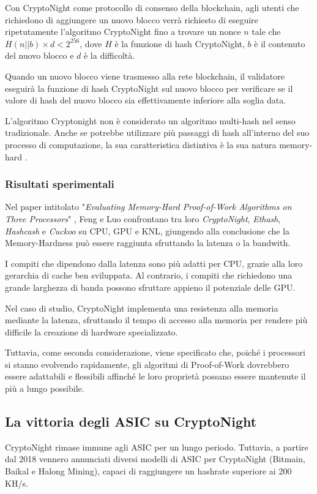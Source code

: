 Con CryptoNight come protocollo di consenso della blockchain, agli utenti che richiedono di aggiungere un nuovo blocco verrà richiesto di eseguire ripetutamente l'algoritmo CryptoNight fino a trovare un nonce $n$ tale che $H(n||b) \times d < 2^{256}$, dove $H$ è la funzione di hash CryptoNight, $b$ è il contenuto del nuovo blocco e $d$ è la difficoltà. 

Quando un nuovo blocco viene trasmesso alla rete blockchain, il validatore eseguirà la funzione di hash CryptoNight sul nuovo blocco per verificare se il valore di hash del nuovo blocco sia effettivamente inferiore alla soglia data.

L'algoritmo Cryptonight non è considerato un algoritmo multi-hash nel senso tradizionale. Anche se potrebbe utilizzare più passaggi di hash all'interno del suo processo di computazione, la sua caratteristica distintiva è la sua natura memory-hard . 



\subsubsection{Risultati sperimentali}
Nel paper intitolato "\textit{Evaluating Memory-Hard Proof-of-Work Algorithms on Three Processors}" \cite{asic_memory_hard}, Feng e Luo confrontano tra loro \textit{CryptoNight}, \textit{Ethash}, \textit{Hashcash} e \textit{Cuckoo} su CPU, GPU e KNL, giungendo alla conclusione che la Memory-Hardness può essere raggiunta sfruttando la latenza o la bandwith.

I compiti che dipendono dalla latenza sono più adatti per CPU, grazie alla loro gerarchia di cache ben sviluppata. 
Al contrario, i compiti che richiedono una grande larghezza di banda possono sfruttare appieno il potenziale delle GPU.

Nel caso di studio, CryptoNight implementa una resistenza alla memoria mediante la latenza, sfruttando il tempo di accesso alla memoria per rendere più difficile la creazione di hardware specializzato.

Tuttavia, come seconda considerazione, viene specificato che, poiché i processori si stanno evolvendo rapidamente, gli algoritmi di Proof-of-Work dovrebbero essere adattabili e flessibili affinché le loro proprietà possano essere mantenute il più a lungo possibile. 



\subsection{La vittoria degli ASIC su CryptoNight}
CryptoNight rimase immune agli ASIC per un lungo periodo. Tuttavia, a partire dal 2018 vennero annunciati diversi modelli di ASIC per CryptoNight (Bitmain, Baikal e Halong Mining), capaci di raggiungere un hashrate superiore ai 200 KH/s.


